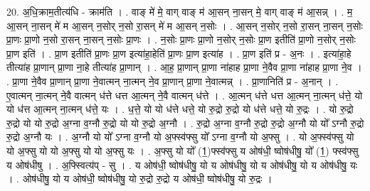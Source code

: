 \documentclass[17pt]{extarticle}
\begin{document}
20. अ॒धि॒क्राम॒तीत्य॑धि - क्राम॑ति । . वाङ् मे॑ मे॒ वाग् वाङ् म॑ आ॒सन् ना॒सन् मे॒ वाग् वाङ् म॑ आ॒सन्न् । . म॒ आ॒सन् ना॒सन् मे॑ म आ॒सन् न॒सोर् न॒सो रा॒सन् मे॑ म आ॒सन् न॒सोः । . आ॒सन् न॒सोर् न॒सो रा॒सन् ना॒सन् न॒सोः प्रा॒णः प्रा॒णो न॒सो रा॒सन् ना॒सन् न॒सोः प्रा॒णः । . न॒सोः प्रा॒णः प्रा॒णो न॒सोर् न॒सोः प्रा॒ण इतीति॑ प्रा॒णो न॒सोर् न॒सोः प्रा॒ण इति॑ । . प्रा॒ण इतीति॑ प्रा॒णः प्रा॒ण इत्या॑हा॒हेति॑ प्रा॒णः प्रा॒ण इत्या॑ह । . प्रा॒ण इति॑ प्र - अ॒नः । . इत्या॑हा॒हे तीत्या॑ह प्रा॒णान् प्रा॒णा ना॒हे तीत्या॑ह प्रा॒णान् । . आ॒ह॒ प्रा॒णान् प्रा॒णा ना॑हाह प्रा॒णा ने॒वैव प्रा॒णा ना॑हाह प्रा॒णा ने॒व । . प्रा॒णा ने॒वैव प्रा॒णान् प्रा॒णा ने॒वात्मन् ना॒त्मन् ने॒व प्रा॒णान् प्रा॒णा ने॒वात्मन्न् । . प्रा॒णानिति॑ प्र - अ॒नान् । . ए॒वात्मन् ना॒त्मन् ने॒वै वात्मन् ध॑त्ते धत्त आ॒त्मन् ने॒वै वात्मन् ध॑त्ते । . आ॒त्मन् ध॑त्ते धत्त आ॒त्मन् ना॒त्मन् ध॑त्ते॒ यो यो ध॑त्त आ॒त्मन् ना॒त्मन् ध॑त्ते॒ यः । . ध॒त्ते॒ यो यो ध॑त्ते धत्ते॒ यो रु॒द्रो रु॒द्रो यो ध॑त्ते धत्ते॒ यो रु॒द्रः । . यो रु॒द्रो रु॒द्रो यो यो रु॒द्रो अ॒ग्ना व॒ग्नौ रु॒द्रो यो यो रु॒द्रो अ॒ग्नौ । . रु॒द्रो अ॒ग्ना व॒ग्नौ रु॒द्रो रु॒द्रो अ॒ग्नौ यो यो᳚ ऽग्नौ रु॒द्रो रु॒द्रो अ॒ग्नौ यः । . अ॒ग्नौ यो यो᳚ ऽग्ना व॒ग्नौ यो अ॒फ्स्व॑फ्सु यो᳚ ऽग्ना व॒ग्नौ यो अ॒फ्सु । . यो अ॒फ्स्व॑फ्सु यो यो अ॒फ्सु यो यो अ॒फ्सु यो यो अ॒फ्सु यः । . अ॒फ्सु यो यो᳚ (1॒)फ्स्व॑फ्सु य ओष॑धी॒ ष्वोष॑धीषु॒ यो᳚ (1॒) फ्स्व॑फ्सु य ओष॑धीषु । . अ॒फ्स्वित्य॑प् - सु । . य ओष॑धी॒ ष्वोष॑धीषु॒ यो य ओष॑धीषु॒ यो य ओष॑धीषु॒ यो य ओष॑धीषु॒ यः । . ओष॑धीषु॒ यो य ओष॑धी॒ ष्वोष॑धीषु॒ यो रु॒द्रो रु॒द्रो य ओष॑धी॒ ष्वोष॑धीषु॒ यो रु॒द्रः । \newline
\end{document}
